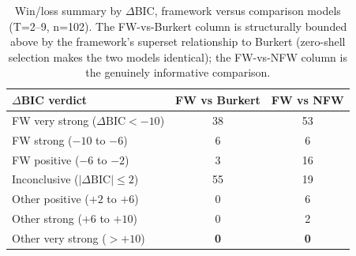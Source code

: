 \begin{table}
\centering
\caption{Win/loss summary by $\Delta$BIC, framework versus comparison models (T=2--9, n=102). The FW-vs-Burkert column is structurally bounded above by the framework's superset relationship to Burkert (zero-shell selection makes the two models identical); the FW-vs-NFW column is the genuinely informative comparison.}
\label{tab:dbic}
\begin{tabular}{lcc}
\toprule
$\Delta$BIC verdict & FW vs Burkert & FW vs NFW \\
\midrule
FW very strong ($\Delta\mathrm{BIC} < -10$) & 38 & 53 \\
FW strong ($-10$ to $-6$) & 6 & 6 \\
FW positive ($-6$ to $-2$) & 3 & 16 \\
Inconclusive ($|\Delta\mathrm{BIC}| \leq 2$) & 55 & 19 \\
Other positive ($+2$ to $+6$) & 0 & 6 \\
Other strong ($+6$ to $+10$) & 0 & 2 \\
Other very strong ($> +10$) & \textbf{0} & \textbf{0} \\
\bottomrule
\end{tabular}
\end{table}


